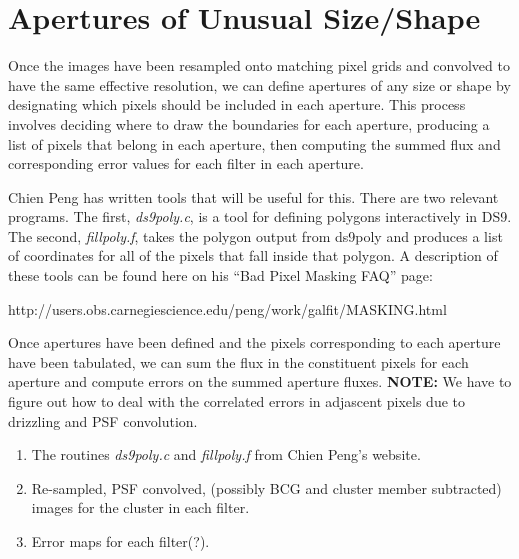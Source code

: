 \documentclass[preprint,12pt]{aastex}
\begin{document}

\section{Apertures of Unusual Size/Shape}\label{apertures}

Once the images have been resampled onto matching pixel grids and
convolved to have the same effective resolution, we can define
apertures of any size or shape by designating which pixels should be
included in each aperture.  This process involves deciding where to
draw the boundaries for each aperture, producing a list of pixels that
belong in each aperture, then computing the summed flux and
corresponding error values for each filter in each aperture.

Chien Peng has written tools that will be useful for this.  There are
two relevant programs.  The first, {\it{ds9poly.c}}, is a tool for
defining polygons interactively in DS9.  The second,
{\it{fillpoly.f}}, takes the polygon output from ds9poly and produces
a list of coordinates for all of the pixels that fall inside that
polygon.  A description of these tools can be found here on his ``Bad
Pixel Masking FAQ'' page:

\begin{center}\vspace{-0.1in}
http://users.obs.carnegiescience.edu/peng/work/galfit/MASKING.html
\end{center}

Once apertures have been defined and the pixels corresponding to each
aperture have been tabulated, we can sum the flux in the constituent
pixels for each aperture and compute errors on the summed aperture
fluxes.  {\bf{NOTE:}} We have to figure out how to deal with the
correlated errors in adjascent pixels due to drizzling and PSF
convolution.  

\vspace{0.08in}
\vspace{-0.1in}
\begin{enumerate}\itemsep-6pt
\item {The routines {\it{ds9poly.c}} and {\it{fillpoly.f}} from Chien
  Peng's website.}
\item {Re-sampled, PSF convolved, (possibly BCG and cluster member
  subtracted) images for the cluster in each filter.}
\item {Error maps for each filter(?).}
\end{enumerate}
\end{document}
